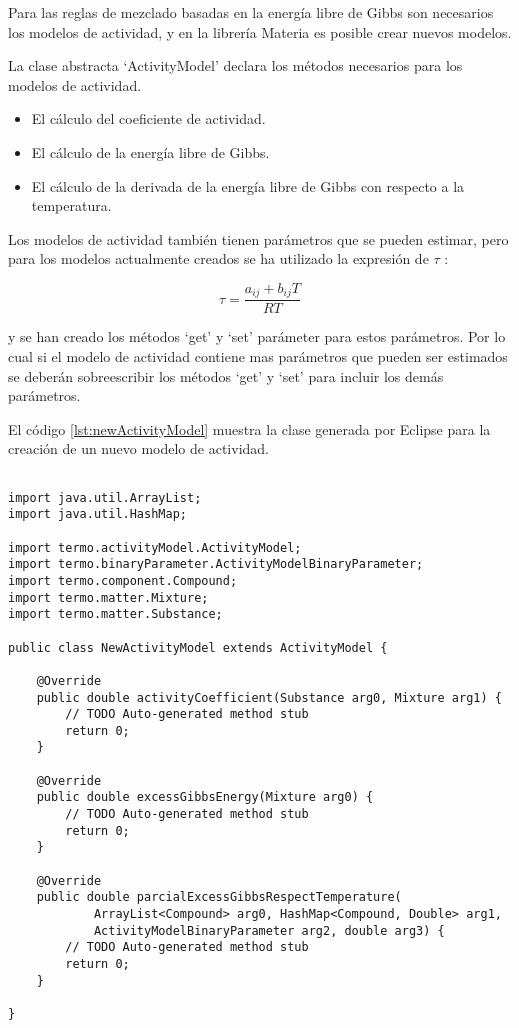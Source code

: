 	Para las reglas de mezclado basadas en la energía libre de Gibbs son necesarios los modelos de actividad, y en la librería Materia es posible crear nuevos modelos.

	La clase abstracta `ActivityModel' declara los métodos necesarios para los modelos de actividad.

	\begin{itemize}
		\item El cálculo del coeficiente de actividad.
		\item El cálculo de la energía libre de Gibbs.
		\item El cálculo de la derivada de la energía libre de Gibbs con respecto a la temperatura.
	\end{itemize}

	Los modelos de actividad también tienen parámetros que se pueden estimar, pero para los modelos actualmente creados se ha utilizado la expresión de $\tau$ :

	\begin{equation}
		\tau = \frac{a_{ij} + b_{ij} T}{R T}
	\end{equation}

	y se han creado los métodos `get' y `set' parámeter para estos parámetros. Por lo cual si el modelo de actividad contiene mas parámetros que pueden ser estimados se deberán sobreescribir los métodos `get' y `set' para incluir los demás parámetros.

	El código \ref{lst:newActivityModel} muestra la clase generada por Eclipse para la creación de un nuevo modelo de actividad.

	\begin{lstlisting}[caption={Esqueleto de clase para la creación de un nuevo modelo de actividad},label={lst:newActivityModel}]

import java.util.ArrayList;
import java.util.HashMap;

import termo.activityModel.ActivityModel;
import termo.binaryParameter.ActivityModelBinaryParameter;
import termo.component.Compound;
import termo.matter.Mixture;
import termo.matter.Substance;

public class NewActivityModel extends ActivityModel {

	@Override
	public double activityCoefficient(Substance arg0, Mixture arg1) {
		// TODO Auto-generated method stub
		return 0;
	}

	@Override
	public double excessGibbsEnergy(Mixture arg0) {
		// TODO Auto-generated method stub
		return 0;
	}

	@Override
	public double parcialExcessGibbsRespectTemperature(
			ArrayList<Compound> arg0, HashMap<Compound, Double> arg1,
			ActivityModelBinaryParameter arg2, double arg3) {
		// TODO Auto-generated method stub
		return 0;
	}

}
	\end{lstlisting}


